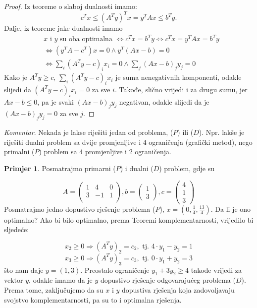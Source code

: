\documentclass[b5paper, utf8, 11pt, colorlinks]{book}
\theoremstyle{definition}
\newtheorem{primjer}{Primjer}[chapter]
\begin{document}
\begin{proof}
	Iz teoreme o slaboj dualnosti imamo:  
	\begin{equation} 
		c^Tx \leq ( A^T y)^T x = y^T A x \leq b^T y.  
	\end{equation} 
	Dalje, iz teoreme jake dualnosti imamo   
	\begin{align*} 
		&x \mbox{ i } y \mbox{ su oba optimalna } \Longleftrightarrow c^T x = b^T y  \Longleftrightarrow c^Tx = y^TA x = b^Ty \\ 
		&\Longleftrightarrow (y^T A - c^T) x = 0 \wedge y^T(Ax - b )  = 0\\ 
		& \Longleftrightarrow \sum_i (A^T y - c)_i x_i = 0 \wedge \sum_j (Ax - b)_j y_j = 0 
	\end{align*} 
	Kako je $A^Ty \geq c$, $\sum_i (A^T y - c)_i x_i$ je suma nenegativnih komponenti, odakle  slijedi da   $(A^T y - c)_i x_i= 0$ za sve $i$. Takođe, slično vrijedi i za drugu sumu, jer $Ax - b \leq 0$, pa je svaki  $(Ax - b)_j y_j$ negativan, odakle slijedi da je $(Ax - b)_j y_j = 0$ za sve $j$.
\end{proof} 

\emph{Komentar}.  Nekada je lakse riješiti jedan od problema, ($P$)  ili  ($D$).  Npr. lakše je riješiti dualni problem sa dvije promjenljive i 4 ograničenja (grafički metod), nego primalni  ($P$)  problem sa 4 promjenljive i 2 ograničenja. 

\begin{primjer} Posmatrajmo primarni  ($P$)  i dualni ($D$) problem, gdje su
\end{primjer}

$$      A = \left(\begin{array}{ccc}
	1 &  4 & 0 \\
	3 & -1 & 1 \\
\end{array} \right ), b = \left (\begin{array}{c}
	1 \\
	3
\end{array}\right ), c =\left ( \begin{array}{c}
	4  \\
	1  \\
	3
\end{array} \right )
$$
Posmatrajmo jedno dopustivo rješenje problema  ($P$), $x = (0, \frac{1}{4}, \frac{13}{4})$. Da li je ono optimalno? Ako bi bilo optimalno,  prema Teoremi komplementarnosti, vrijedilo bi sljedeće:

$$x_2 \geq 0 \Rightarrow  (A^T y)_2  = c_2, \mbox{ tj. } 4 \cdot y_1 - y_2 = 1$$
$$x_3 \geq 0 \Rightarrow  (A^T y)_3  = c_3, \mbox{ tj. } 0 \cdot y_1 + y_2 = 3$$
što nam daje  $y = (1, 3)$. Preostalo ograničenje $y_1 + 3 y_2 \geq 4$ takođe vrijedi za vektor $y$, odakle imamo da je $y$ dopustivo rješenje odgovarajućeg problema  ($D$).  Prema tome, zaključujemo da su $x$ i $y$ dopustiva rješenja koja zadovoljavaju svojstvo komplementarnosti, pa su to i optimalna rješenja. 
\end{document}

